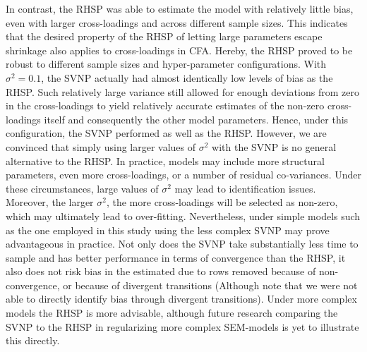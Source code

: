 \documentclass[
  man, donotrepeattitle,floatsintext]{apa6}
\begin{document}
In contrast, the RHSP was able to estimate the model with relatively little bias, even with larger cross-loadings and across different sample sizes. This indicates that the desired property of the RHSP of letting large parameters escape shrinkage also applies to cross-loadings in CFA. Hereby, the RHSP proved to be robust to different sample sizes and hyper-parameter configurations. With \(\sigma^2 = 0.1\), the SVNP actually had almost identically low levels of bias as the RHSP. Such relatively large variance still allowed for enough deviations from zero in the cross-loadings to yield relatively accurate estimates of the non-zero cross-loadings itself and consequently the other model parameters. Hence, under this configuration, the SVNP performed as well as the RHSP. However, we are convinced that simply using larger values of \(\sigma^2\) with the SVNP is no general alternative to the RHSP. In practice, models may include more structural parameters, even more cross-loadings, or a number of residual co-variances. Under these circumstances, large values of \(\sigma^2\) may lead to identification issues. Moreover, the larger \(\sigma^2\), the more cross-loadings will be selected as non-zero, which may ultimately lead to over-fitting. Nevertheless, under simple models such as the one employed in this study using the less complex SVNP may prove advantageous in practice. Not only does the SVNP take substantially less time to sample and has better performance in terms of convergence than the RHSP, it also does not risk bias in the estimated due to rows removed because of non-convergence, or because of divergent transitions (Although note that we were not able to directly identify bias through divergent transitions). Under more complex models the RHSP is more advisable, although future research comparing the SVNP to the RHSP in regularizing more complex SEM-models is yet to illustrate this directly.
\end{document}
